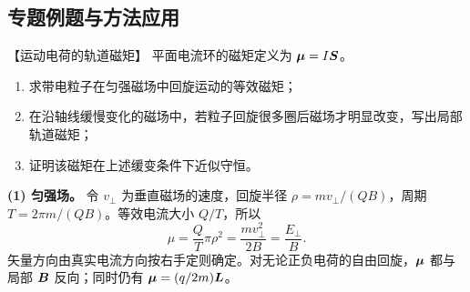 {\subsection{专题例题与方法应用}

\begin{origexamplebox}{【运动电荷的轨道磁矩】}\label{ch22:ex:s38-7-17}
平面电流环的磁矩定义为 $\bm{\mu}=I\bm{S}$。
\begin{enumerate}[label=(\arabic*),leftmargin=2.2em]
  \item 求带电粒子在匀强磁场中回旋运动的等效磁矩；
  \item 在沿轴线缓慢变化的磁场中，若粒子回旋很多圈后磁场才明显改变，写出局部轨道磁矩；
  \item 证明该磁矩在上述缓变条件下近似守恒。
\end{enumerate}

\begin{center}\begin{minipage}{.96\linewidth}\centering
{}
\end{minipage}\end{center}
\end{origexamplebox}\par\nopagebreak[4]

\begin{xesolution}
\textbf{(1) 匀强场。}
令 $v_\perp$ 为垂直磁场的速度，回旋半径 $\rho=mv_\perp/(Q B)$，周期
$T=2\pi m/(QB)$。等效电流大小 $Q/T$，所以
\begin{equation}
  \boxed{\mu=\frac{Q}{T}\pi\rho^2
  =\frac{mv_\perp^2}{2B}=\frac{E_\perp}{B}}.
\end{equation}
矢量方向由真实电流方向按右手定则确定。对无论正负电荷的自由回旋，$\bm{\mu}$ 都与局部
$\bm{B}$ 反向；同时仍有 $\bm{\mu}=(q/2m)\bm{L}$。


\end{xesolution}}
